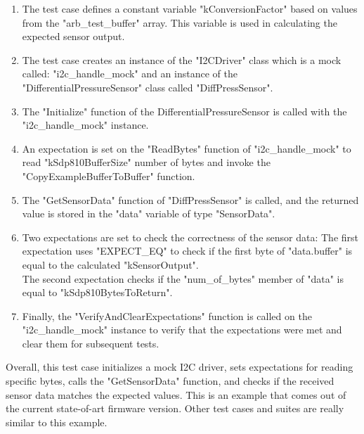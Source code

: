 \begin{enumerate}
    \item The test case defines a constant variable "kConversionFactor" based on values from the "arb\_test\_buffer" array. This variable is used in calculating the expected sensor output.
    \item The test case creates an instance of the "I2CDriver" class which is a mock called: "i2c\_handle\_mock" and an instance of the "DifferentialPressureSensor" class called "DiffPressSensor".
    \item The "Initialize" function of the DifferentialPressureSensor is called with the "i2c\_handle\_mock" instance.
    \item An expectation is set on the "ReadBytes" function of "i2c\_handle\_mock" to read "kSdp810BufferSize" number of bytes and invoke the "CopyExampleBufferToBuffer" function.
    \item The "GetSensorData" function of "DiffPressSensor" is called, and the returned value is stored in the "data" variable of type "SensorData".
    \item Two expectations are set to check the correctness of the sensor data:
        The first expectation uses "EXPECT\_EQ" to check if the first byte of "data.buffer" is equal to the calculated "kSensorOutput".\\
        The second expectation checks if the "num\_of\_bytes" member of "data" is equal to "kSdp810BytesToReturn".
    \item Finally, the "VerifyAndClearExpectations" function is called on the "i2c\_handle\_mock" instance to verify that the expectations were met and clear them for subsequent tests.
\end{enumerate}
Overall, this test case initializes a mock I2C driver, sets expectations for reading specific bytes, calls the "GetSensorData" function, and checks if the received sensor data matches the expected values. This is an example that comes out of the current state-of-art firmware version. Other test cases and suites are really similar to this example.\\\\ 
